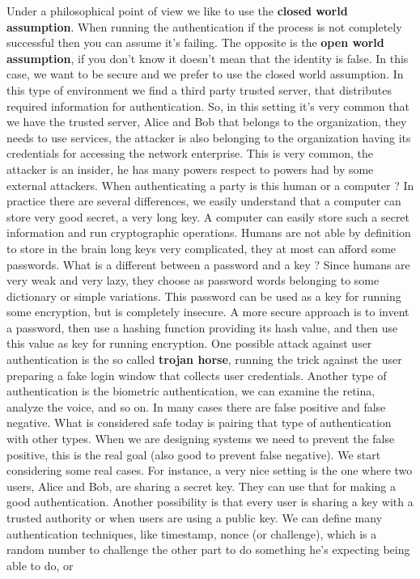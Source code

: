 \documentclass[11pt]{article}
\begin{document}
Under a philosophical point of view we like to use the \textbf{closed world assumption}. When running the authentication if the process is not completely successful then you can assume it's failing. The opposite is the \textbf{open world assumption}, if you don't know it doesn't mean that the identity is false. In this case, we want to be secure and we prefer to use the closed world assumption. In this type of environment we find a third party trusted server, that distributes required information for authentication. So, in this setting it's very common that we have the trusted server, Alice and Bob that belongs to the organization, they needs to use services, the attacker is also belonging to the organization having its credentials for accessing the network enterprise. This is very common, the attacker is an insider, he has many powers respect to powers had by some external attackers. When authenticating a party is this human or a computer ? In practice there are several differences, we easily understand that a computer can store very good secret, a very long key. A computer can easily store such a secret information and run cryptographic operations. Humans are not able by definition to store in the brain long keys very complicated, they at most can afford some passwords. What is a different between a password and a key ? Since humans are very weak and very lazy, they choose as password words belonging to some dictionary or simple variations. This password can be used as a key for running some encryption, but is completely insecure. A more secure approach is to invent a password, then use a hashing function providing its hash value, and then use this value as key for running encryption. One possible attack against user authentication is the so called \textbf{trojan horse}, running the trick against the user preparing a fake login window that collects user credentials. Another type of authentication is the biometric authentication, we can examine the retina, analyze the voice, and so on. In many cases there are false positive and false negative. What is considered safe today is pairing that type of authentication with other types. When we are designing systems we need to prevent the false positive, this is the real goal (also good to prevent false negative). We start considering some real cases. For instance, a very nice setting is the one where two users, Alice and Bob, are sharing a secret key. They can use that for making a good authentication. Another possibility is that every user is sharing a key with a trusted authority or when users are using a public key. We can define many authentication techniques, like timestamp, nonce (or challenge), which is a random number to challenge the other part to do something he's expecting being able to do, or
\end{document}
